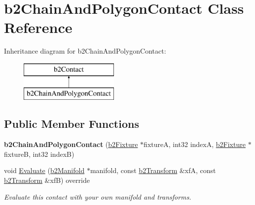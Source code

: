 \hypertarget{classb2ChainAndPolygonContact}{}\section{b2\+Chain\+And\+Polygon\+Contact Class Reference}
\label{classb2ChainAndPolygonContact}
Inheritance diagram for b2\+Chain\+And\+Polygon\+Contact\+:\begin{figure}[H]
\begin{center}
\leavevmode
\includegraphics[height=2.000000cm]{classb2ChainAndPolygonContact}
\end{center}
\end{figure}
\subsection*{Public Member Functions}
\begin{DoxyCompactItemize}
\item 
\mbox{\label{classb2ChainAndPolygonContact_ae43cd05c72ccaeb5f03efc5df944648b}} 
{\bfseries b2\+Chain\+And\+Polygon\+Contact} (\mbox{\hyperlink{classb2Fixture}{b2\+Fixture}} $\ast$fixtureA, int32 indexA, \mbox{\hyperlink{classb2Fixture}{b2\+Fixture}} $\ast$fixtureB, int32 indexB)
\item 
\mbox{\label{classb2ChainAndPolygonContact_a607e7a8b4b0a5ee9bfd100a365fb6f3b}} 
void \mbox{\hyperlink{classb2ChainAndPolygonContact_a607e7a8b4b0a5ee9bfd100a365fb6f3b}{Evaluate}} (\mbox{\hyperlink{structb2Manifold}{b2\+Manifold}} $\ast$manifold, const \mbox{\hyperlink{structb2Transform}{b2\+Transform}} \&xfA, const \mbox{\hyperlink{structb2Transform}{b2\+Transform}} \&xfB) override
\begin{DoxyCompactList}\small\item\em Evaluate this contact with your own manifold and transforms. \end{DoxyCompactList}\end{DoxyCompactItemize}
